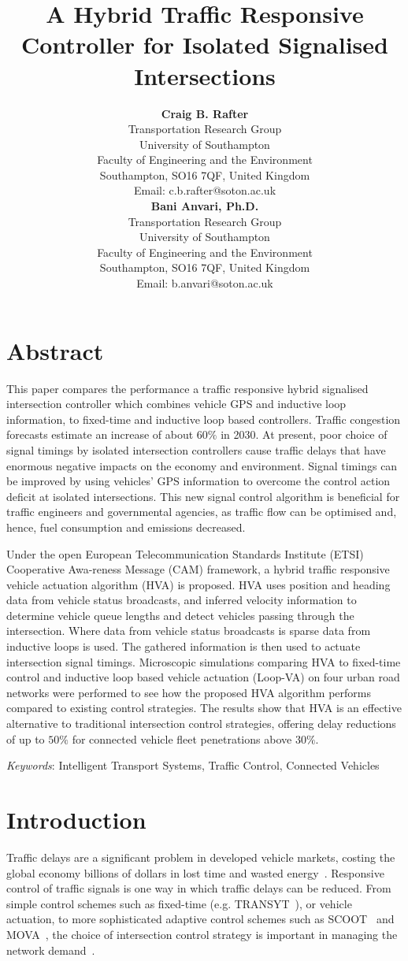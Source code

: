 \documentclass[numbered]{trbunofficial}
\title{A Hybrid Traffic Responsive Controller for Isolated Signalised Intersections}
\author{%
  \textbf{Craig B. Rafter}\\
	Transportation Research Group\\
	University of Southampton\\
	Faculty of Engineering and the Environment\\
	Southampton, SO16 7QF, United Kingdom\\
	Email: c.b.rafter@soton.ac.uk\\
  \hfill\break%
  \textbf{Bani Anvari, Ph.D.}\\
	Transportation Research Group\\
	University of Southampton\\
	Faculty of Engineering and the Environment\\
	Southampton, SO16 7QF, United Kingdom\\
	Email: b.anvari@soton.ac.uk
}
\begin{document}
\maketitle

\section{Abstract}

This paper compares the performance a traffic responsive hybrid signalised intersection controller which combines vehicle GPS and inductive loop information, to fixed-time and inductive loop based controllers. 
Traffic congestion forecasts estimate an increase of about ${60\%}$ in 2030. 
At present, poor choice of signal timings by isolated intersection controllers cause traffic delays that have enormous negative impacts on the economy and environment. 
Signal timings can be improved by using vehicles' GPS information to overcome the control action deficit at isolated intersections. 
This new signal control algorithm is beneficial for traffic engineers and governmental agencies, as traffic flow can be optimised and, hence, fuel consumption and emissions decreased.

Under the open European Telecommunication Standards Institute (ETSI) Cooperative Awa-reness Message (CAM) framework, a hybrid traffic responsive vehicle actuation algorithm (HVA) is proposed. HVA uses position and heading data from vehicle status broadcasts, and inferred velocity information to determine vehicle queue lengths and detect vehicles passing through the intersection. Where data from vehicle status broadcasts is sparse data from inductive loops is used. The gathered information is then used to actuate intersection signal timings.
Microscopic simulations comparing HVA to fixed-time control and inductive loop based vehicle actuation (Loop-VA) on four urban road networks were performed to see how the proposed HVA algorithm performs compared to existing control strategies. 
The results show that HVA is an effective alternative to traditional intersection control strategies, offering delay reductions of up to ${50\%}$ for connected vehicle fleet penetrations above ${30\%}$.

\hfill\break%
\noindent\textit{Keywords}: Intelligent Transport Systems, Traffic Control, Connected Vehicles
\newpage

\section{Introduction}\label{sec:intro}
Traffic delays are a significant problem in developed vehicle markets, costing the global economy billions of dollars in lost time and wasted energy~\cite{inrix2014}.
Responsive control of traffic signals is one way in which traffic delays can be reduced. From simple control schemes such as fixed-time (e.g. TRANSYT~\cite{robertson69}), or vehicle actuation, to more sophisticated adaptive control schemes such as SCOOT~\cite{hunt1981} and MOVA~\cite{vincent88}, the choice of intersection control strategy is important in managing the network demand~\cite{papageorgiou2003}. 
\end{document}
